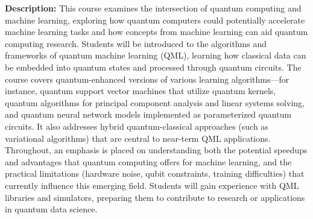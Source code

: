 \documentclass{scrreprt}
\begin{document}
\textbf{Description:} This course examines the intersection of quantum computing and machine learning, exploring how quantum computers could potentially accelerate machine learning tasks and how concepts from machine learning can aid quantum computing research. Students will be introduced to the algorithms and frameworks of quantum machine learning (QML), learning how classical data can be embedded into quantum states and processed through quantum circuits. The course covers quantum-enhanced versions of various learning algorithms—for instance, quantum support vector machines that utilize quantum kernels, quantum algorithms for principal component analysis and linear systems solving, and quantum neural network models implemented as parameterized quantum circuits. It also addresses hybrid quantum-classical approaches (such as variational algorithms) that are central to near-term QML applications. Throughout, an emphasis is placed on understanding both the potential speedups and advantages that quantum computing offers for machine learning, and the practical limitations (hardware noise, qubit constraints, training difficulties) that currently influence this emerging field. Students will gain experience with QML libraries and simulators, preparing them to contribute to research or applications in quantum data science.
\end{document}
